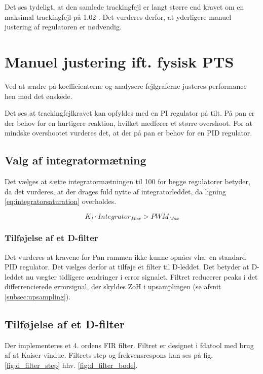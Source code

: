 Det ses tydeligt, at den samlede trackingfejl er langt større end kravet om en 
maksimal trackingfejl på 1.02 \degree.
Det vurderes derfor, at yderligere manuel justering af regulatoren er nødvendig.

\section{Manuel justering ift. fysisk PTS}

Ved at ændre på koefficienterne og analysere fejlgraferne justeres performance 
hen mod det ønskede.

Det ses at trackingfejlkravet kan opfyldes med en PI regulator på tilt.
På pan er der behov for en hurtigere reaktion, hvilket medfører et større overshoot. 
For at mindske overshootet vurderes det, at der på pan er behov for en PID 
regulator.


\subsection{Valg af integratormætning}
Det vælges at sætte integratormætningen til 100 for begge regulatorer betyder, da det vurderes, at der drages
fuld nytte af integratorleddet, da ligning \ref{eq:integratorsaturation} 
overholdes.

\begin{equation}
	K_I \cdot Integrator_{Max} > PWM_{Max}
\label{eq:integratorsaturation} 
\end{equation}



\subsubsection{Tilføjelse af et D-filter}
Det vurderes at kravene for Pan rammen ikke kunne opnåes vha. en standard PID regulator. 
Det vælges derfor at tilføje et filter til D-leddet. 
Det betyder at D-leddet nu vægter tidligere ændringer i error signalet. 
Filtret reducerer peaks i det differrencierede errorsignal, der skyldes ZoH i upsamplingen (se afsnit \ref{subsec:upsampling}).

\subsection{Tilføjelse af et D-filter}
Der implementeres et 4. ordens FIR filter. Filtret er designet i fdatool med brug af at Kaiser vindue. Filtrets step og frekvensrespons kan ses på fig. \ref{fig:d_filter_step} hhv. \ref{fig:d_filter_bode}. 

